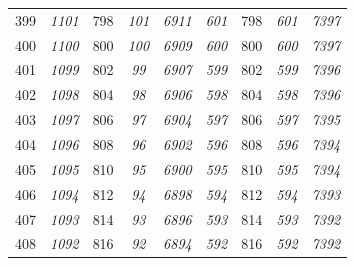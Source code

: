 \documentclass[10pt,fleqn]{article}
\begin{document}
\begin{longtable}{c|cccccccc}
399 & {\color{blue} \it 1101 \rm} & {\color{black} 798} & {\color{blue} \it 101 \rm} & {\color{blue} \it 6911 \rm} & {\color{blue} \it 601 \rm} & {\color{black} 798} & {\color{blue} \it 601 \rm} & {\color{blue} \it 7397 \rm} \\
400 & {\color{blue} \it 1100 \rm} & {\color{black} 800} & {\color{blue} \it 100 \rm} & {\color{blue} \it 6909 \rm} & {\color{blue} \it 600 \rm} & {\color{black} 800} & {\color{blue} \it 600 \rm} & {\color{blue} \it 7397 \rm} \\
401 & {\color{blue} \it 1099 \rm} & {\color{black} 802} & {\color{blue} \it 99 \rm} & {\color{blue} \it 6907 \rm} & {\color{blue} \it 599 \rm} & {\color{black} 802} & {\color{blue} \it 599 \rm} & {\color{blue} \it 7396 \rm} \\
402 & {\color{blue} \it 1098 \rm} & {\color{black} 804} & {\color{blue} \it 98 \rm} & {\color{blue} \it 6906 \rm} & {\color{blue} \it 598 \rm} & {\color{black} 804} & {\color{blue} \it 598 \rm} & {\color{blue} \it 7396 \rm} \\
403 & {\color{blue} \it 1097 \rm} & {\color{black} 806} & {\color{blue} \it 97 \rm} & {\color{blue} \it 6904 \rm} & {\color{blue} \it 597 \rm} & {\color{black} 806} & {\color{blue} \it 597 \rm} & {\color{blue} \it 7395 \rm} \\
404 & {\color{blue} \it 1096 \rm} & {\color{black} 808} & {\color{blue} \it 96 \rm} & {\color{blue} \it 6902 \rm} & {\color{blue} \it 596 \rm} & {\color{black} 808} & {\color{blue} \it 596 \rm} & {\color{blue} \it 7394 \rm} \\
405 & {\color{blue} \it 1095 \rm} & {\color{black} 810} & {\color{blue} \it 95 \rm} & {\color{blue} \it 6900 \rm} & {\color{blue} \it 595 \rm} & {\color{black} 810} & {\color{blue} \it 595 \rm} & {\color{blue} \it 7394 \rm} \\
406 & {\color{blue} \it 1094 \rm} & {\color{black} 812} & {\color{blue} \it 94 \rm} & {\color{blue} \it 6898 \rm} & {\color{blue} \it 594 \rm} & {\color{black} 812} & {\color{blue} \it 594 \rm} & {\color{blue} \it 7393 \rm} \\
407 & {\color{blue} \it 1093 \rm} & {\color{black} 814} & {\color{blue} \it 93 \rm} & {\color{blue} \it 6896 \rm} & {\color{blue} \it 593 \rm} & {\color{black} 814} & {\color{blue} \it 593 \rm} & {\color{blue} \it 7392 \rm} \\
408 & {\color{blue} \it 1092 \rm} & {\color{black} 816} & {\color{blue} \it 92 \rm} & {\color{blue} \it 6894 \rm} & {\color{blue} \it 592 \rm} & {\color{black} 816} & {\color{blue} \it 592 \rm} & {\color{blue} \it 7392 \rm} \\

\end{longtable}
\end{document}
